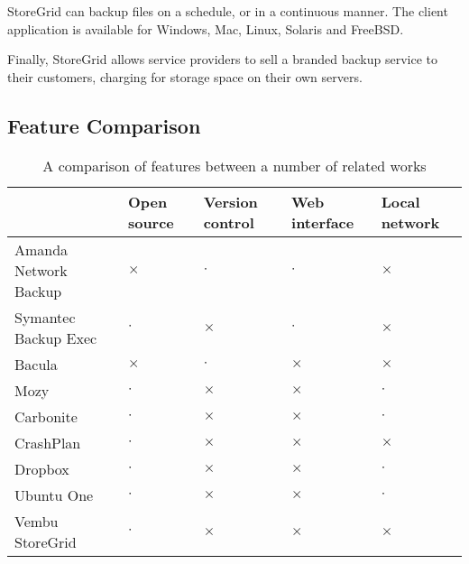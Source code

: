 StoreGrid can backup files on a schedule, or in a continuous manner. The client
application is available for Windows, Mac, Linux, Solaris and FreeBSD.

Finally, StoreGrid allows service providers to sell a branded backup service to
their customers, charging for storage space on their own servers.

\subsection{Feature Comparison}

\begin{table}[H]
    \centering
    \begin{tabular}{ l p{1.5cm} p{1.5cm} p{1.5cm} p{1.5cm} }
        \toprule
        & Open source   & Version control   & Web interface & Local network
        \\ \midrule

        Amanda Network Backup   & $\times$  & $\cdot$   & $\cdot$   & $\times$
        \\

        Symantec Backup Exec    & $\cdot$   & $\times$  & $\cdot$   & $\times$
        \\

        Bacula                  & $\times$  & $\cdot$   & $\times$  & $\times$
        \\

        Mozy                    & $\cdot$   & $\times$  & $\times$  & $\cdot$
        \\

        Carbonite               & $\cdot$   & $\times$  & $\times$  & $\cdot$
        \\

        CrashPlan               & $\cdot$   & $\times$  & $\times$  & $\times$
        \\

        Dropbox                 & $\cdot$   & $\times$  & $\times$  & $\cdot$
        \\

        Ubuntu One              & $\cdot$   & $\times$  & $\times$  & $\cdot$
        \\

        Vembu StoreGrid         & $\cdot$   & $\times$  & $\times$  & $\times$
        \\ \bottomrule
    \end{tabular}
    \caption{A comparison of features between a number of related works}
    \label{tab:feature-comparison}
\end{table}

